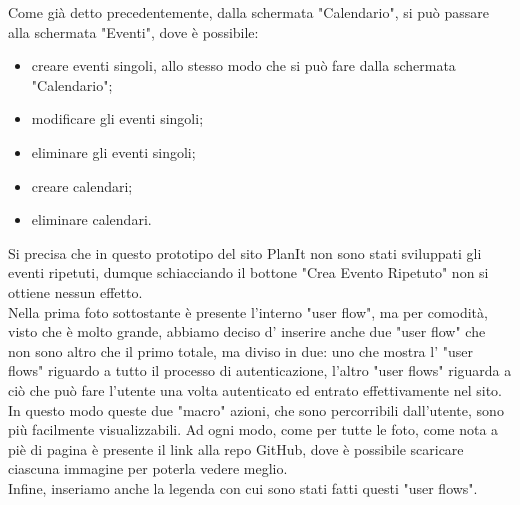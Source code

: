 Come già detto precedentemente, dalla schermata "Calendario", si può passare alla schermata "Eventi", dove è possibile:
\begin{itemize}
    \item creare eventi singoli, allo stesso modo che si può fare dalla schermata "Calendario";
    \item modificare gli eventi singoli;
    \item eliminare gli eventi singoli;
    \item creare calendari;
    \item eliminare calendari.
\end{itemize}
Si precisa che in questo prototipo del sito PlanIt non sono stati sviluppati gli eventi ripetuti, dumque schiacciando il bottone "Crea Evento Ripetuto" non si ottiene nessun effetto. \\
Nella prima foto sottostante è presente l'interno "user flow", ma per comodità, visto che è molto grande, abbiamo deciso d' inserire anche due "user flow" che non sono altro che il primo totale, ma diviso in due: uno che mostra l' "user flows" riguardo a tutto il processo di autenticazione, l'altro "user flows" riguarda a ciò che può fare l'utente una volta autenticato ed entrato effettivamente nel sito. In questo modo queste due "macro" azioni, che sono percorribili dall'utente, sono più facilmente visualizzabili. Ad ogni modo, come per tutte le foto, come nota a piè di pagina è presente il link alla repo GitHub, dove è possibile scaricare ciascuna immagine per poterla vedere meglio. \\
Infine, inseriamo anche la legenda con cui sono stati fatti questi "user flows".

\begin{center}
    
\end{center}

\begin{center}
    
\end{center}

